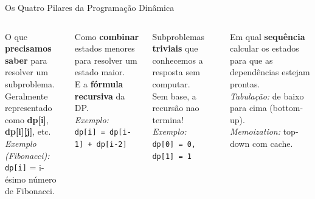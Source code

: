\documentclass[aspectratio=169,10pt]{beamer}
\begin{document}
\begin{frame}{Os Quatro Pilares da Programação Dinâmica}
  \begin{columns}[t]
      \begin{tcolorbox}[caixaDP,title={1. Estado}]
        \footnotesize
        O que \textbf{precisamos saber} para resolver
        um subproblema.\\[3pt]
        Geralmente representado como \textbf{dp[i]},
        \textbf{dp[i][j]}, etc.\\[3pt]
        \textit{Exemplo (Fibonacci):}\\
        \texttt{dp[i]} = i-ésimo número de Fibonacci.
      \end{tcolorbox}
      \vspace{0.10cm}
      \begin{tcolorbox}[caixaTeal,title={2. Transição (Recorrência)}]
        \footnotesize
        Como \textbf{combinar} estados menores para
        resolver um estado maior.\\[3pt]
        E a \textbf{fórmula recursiva} da DP.\\[3pt]
        \textit{Exemplo:}\\
        \texttt{dp[i] = dp[i-1] + dp[i-2]}
      \end{tcolorbox}
      \begin{tcolorbox}[caixaVerde,title={3. Caso Base}]
        \footnotesize
        Subproblemas \textbf{triviais} que conhecemos
        a resposta sem computar.\\[3pt]
        Sem base, a recursão nao termina!\\[3pt]
        \textit{Exemplo:}\\
        \texttt{dp[0] = 0, dp[1] = 1}
      \end{tcolorbox}
      \vspace{0.10cm}
      \begin{tcolorbox}[caixaLaranja,title={4. Ordem de Computação}]
        \footnotesize
        Em qual \textbf{sequência} calcular os estados
        para que as dependências estejam prontas.\\[3pt]
        \textit{Tabulação:} de baixo para cima (bottom-up).\\
        \textit{Memoization:} top-down com cache.
      \end{tcolorbox}
  \end{columns}
\end{frame}
\end{document}
